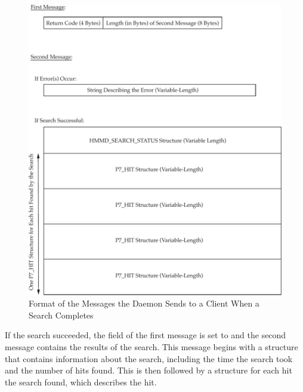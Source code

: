 \documentclass[notoc,justified]{tufte-book}    %
\begin{document}
{\begin{figure}
\includegraphics[width=\textwidth]{inclusions/daemon-results.pdf}
\caption{Format of the Messages the Daemon Sends to a Client When a Search Completes}
\label{fig:search-results}
\end{figure}

If the search succeeded, the  field of the first message is set to  and the second message contains the results of the search.  This message begins with a  structure that contains information about the search, including the time the search took and the number of hits found.  This is then followed by a  structure for each hit the search found, which describes the hit.

}
\end{document}
